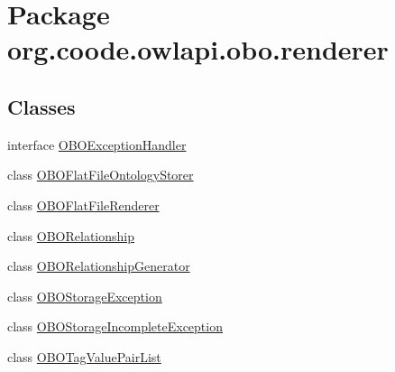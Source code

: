 \hypertarget{namespaceorg_1_1coode_1_1owlapi_1_1obo_1_1renderer}{\section{Package org.\-coode.\-owlapi.\-obo.\-renderer}
\label{namespaceorg_1_1coode_1_1owlapi_1_1obo_1_1renderer}
}
\subsection*{Classes}
\begin{DoxyCompactItemize}
\item 
interface \hyperlink{interfaceorg_1_1coode_1_1owlapi_1_1obo_1_1renderer_1_1_o_b_o_exception_handler}{O\-B\-O\-Exception\-Handler}
\item 
class \hyperlink{classorg_1_1coode_1_1owlapi_1_1obo_1_1renderer_1_1_o_b_o_flat_file_ontology_storer}{O\-B\-O\-Flat\-File\-Ontology\-Storer}
\item 
class \hyperlink{classorg_1_1coode_1_1owlapi_1_1obo_1_1renderer_1_1_o_b_o_flat_file_renderer}{O\-B\-O\-Flat\-File\-Renderer}
\item 
class \hyperlink{classorg_1_1coode_1_1owlapi_1_1obo_1_1renderer_1_1_o_b_o_relationship}{O\-B\-O\-Relationship}
\item 
class \hyperlink{classorg_1_1coode_1_1owlapi_1_1obo_1_1renderer_1_1_o_b_o_relationship_generator}{O\-B\-O\-Relationship\-Generator}
\item 
class \hyperlink{classorg_1_1coode_1_1owlapi_1_1obo_1_1renderer_1_1_o_b_o_storage_exception}{O\-B\-O\-Storage\-Exception}
\item 
class \hyperlink{classorg_1_1coode_1_1owlapi_1_1obo_1_1renderer_1_1_o_b_o_storage_incomplete_exception}{O\-B\-O\-Storage\-Incomplete\-Exception}
\item 
class \hyperlink{classorg_1_1coode_1_1owlapi_1_1obo_1_1renderer_1_1_o_b_o_tag_value_pair_list}{O\-B\-O\-Tag\-Value\-Pair\-List}
\end{DoxyCompactItemize}
